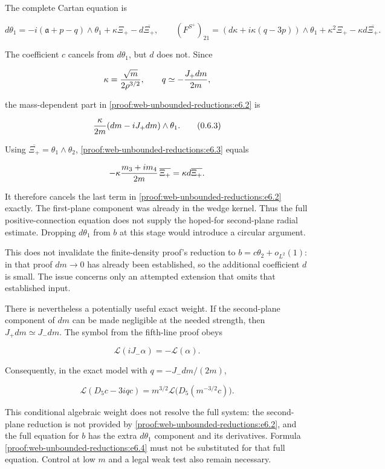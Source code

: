 The complete Cartan equation is

\[
 d\theta_1=-i(\mathfrak a+p-q)\wedge\theta_1
             +\kappa\Xi_+-d\overline{\Xi_+},
 \qquad
 (F^{S^+})_{21}
 =(d\kappa+i\kappa(q-3p))\wedge\theta_1
       +\kappa^2\Xi_+-\kappa d\overline{\Xi_+}.
 \tag{\thesection.6.2}\label{proof:web-unbounded-reductions:e6.2}
\]

The coefficient \(c\) cancels from \(d\theta_1\), but \(d\) does not. Since

\[
 \kappa={\sqrt m\over2\rho^{3/2}},
 \qquad q\simeq-{J_+dm\over2m},
\]

the mass-dependent part in \eqref{proof:web-unbounded-reductions:e6.2} is

\[
 {\kappa\over2m}(dm-iJ_+dm)\wedge\theta_1.
 \tag{\thesection.6.3}\label{proof:web-unbounded-reductions:e6.3}
\]

Using \(\overline{\Xi_+}=\theta_1\wedge\theta_2\), \eqref{proof:web-unbounded-reductions:e6.3} equals

\[
 -\kappa{m_3+im_4\over2m}\,\overline{\Xi_+}
 =\kappa d\overline{\Xi_+}.
\]

It therefore cancels the last term in \eqref{proof:web-unbounded-reductions:e6.2} exactly. The first-plane component was already in the wedge kernel. Thus the full positive-connection equation does not supply the hoped-for second-plane radial estimate. Dropping \(d\theta_1\) from \(b\) at this stage would introduce a circular argument.

This does not invalidate the finite-density proof's reduction to \(b=c\theta_2+o_{L^2}(1)\): in that proof \(dm\to0\) has already been established, so the additional coefficient \(d\) is small. The issue concerns only an attempted extension that omits that established input.

There is nevertheless a potentially useful exact weight. If the second-plane component of \(dm\) can be made negligible at the needed strength, then \(J_+dm\simeq J_-dm\). The symbol from the fifth-line proof obeys

\[
 \mathcal L(iJ_-\alpha)=-\mathcal L(\alpha).
\]

Consequently, in the exact model with \(q=-J_-dm/(2m)\),

\[
 \boxed{
 \mathcal L(D_5c-3iqc)
 =m^{3/2}\mathcal L\bigl(D_5(m^{-3/2}c)\bigr).
 }
 \tag{\thesection.6.4}\label{proof:web-unbounded-reductions:e6.4}
\]

This conditional algebraic weight does not resolve the full system: the second-plane reduction is not provided by \eqref{proof:web-unbounded-reductions:e6.2}, and the full equation for \(b\) has the extra \(d\theta_1\) component and its derivatives. Formula \eqref{proof:web-unbounded-reductions:e6.4} must not be substituted for that full equation. Control at low \(m\) and a legal weak test also remain necessary.


